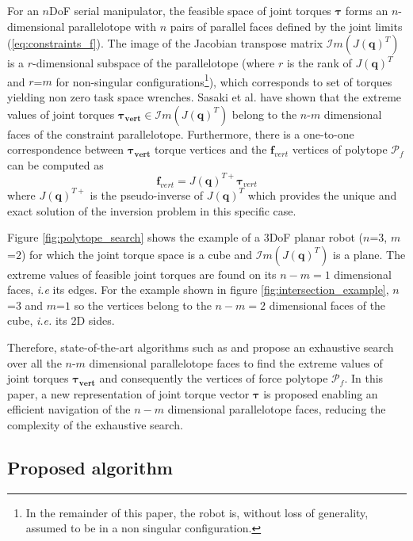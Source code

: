 For an $n$DoF serial manipulator, the feasible space of joint torques $\bm{\tau}$ forms an $n$-dimensional parallelotope with $n$ pairs of parallel faces defined by the joint limits (\ref{eq:constraints_f}). The image of the Jacobian transpose matrix $\mathcal{I}m(J(\bm{q})^T)$ is a $r$-dimensional subspace of the parallelotope (where $r$ is the rank of $J(\bm{q})^T$ and $r$=$m$ for non-singular configurations\footnote{In the remainder of this paper, the robot is, without loss of generality, assumed to be in a non singular configuration.}), which corresponds to set of torques yielding non zero task space wrenches. 
Sasaki et al. \cite{sasaki_vertex_nodate} have shown that the extreme values of joint torques $\bm{\tau_{vert}} \in \mathcal{I}m(J(\bm{q})^T)$ belong to the $n$-$m$ dimensional faces of the constraint parallelotope.  Furthermore, there is a one-to-one correspondence between $\bm{\tau_{vert}}$ torque vertices and the $\bm{f}_{vert}$ vertices of polytope $\mathcal{P}_f$ can be computed as 
\begin{equation}
    \bm{f}_{vert} = J(\bm{q})^{T+}\bm{\tau}_{vert} \label{eq:compute_vert}
\end{equation}
where $J(\bm{q})^{T+}$ is the pseudo-inverse of $J(\bm{q})^{T}$ which provides the unique and exact solution of the inversion problem in this specific case.

Figure \ref{fig:polytope_search} shows the example of a 3DoF planar robot ($n$=$3$, $m$=$2$) for which the joint torque space is a cube and $\mathcal{I}m(J(\bm{q})^T)$ is a plane. The extreme values of feasible joint torques are found on its $n-m=1$ dimensional faces, \textit{i.e} its edges. For the example shown in figure \ref{fig:intersection_example}, $n$=$3$ and $m$=$1$ so the vertices belong to the $n-m=2$ dimensional faces of the cube, \textit{i.e.} its 2D sides.  

Therefore, state-of-the-art algorithms such as \cite{chiacchio_evaluation_1996} and \cite{sasaki_vertex_nodate} propose an exhaustive search over all the $n$-$m$ dimensional parallelotope faces to find the extreme values of joint torques $\bm{\tau_{vert}}$ and consequently the vertices of force polytope $\mathcal{P}_f$. In this paper, a new representation of joint torque vector $\bm{\tau}$ is proposed enabling an efficient navigation of the $n-m$ dimensional parallelotope faces, reducing the complexity of the exhaustive search.

\subsection{Proposed algorithm}

